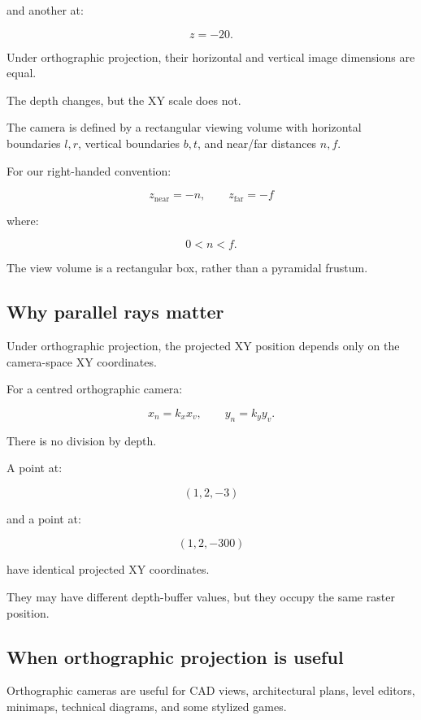 and another at:

\[
 z=-20.
\]

Under orthographic projection, their horizontal and vertical image dimensions are equal.

The depth changes, but the XY scale does not.

The camera is defined by a rectangular viewing volume with horizontal boundaries \(l,r\), vertical boundaries \(b,t\), and near/far distances \(n,f\).

For our right-handed convention:

\[
 z_{\mathrm{near}}=-n, \qquad z_{\mathrm{far}}=-f
\]

where:

\[
 0<n<f.
\]

The view volume is a rectangular box, rather than a pyramidal frustum.

\subsection{Why parallel rays matter}\label{02-foundations-ii-ch033-why-parallel-rays-matter}

\hypertarget{02-foundations-ii-ch033-why-parallel-rays-matter}{}

Under orthographic projection, the projected XY position depends only on the camera-space XY coordinates.

For a centred orthographic camera:

\[
 x_n=k_xx_v, \qquad y_n=k_yy_v.
\]

There is no division by depth.

A point at:

\[
 (1,2,-3)
\]

and a point at:

\[
 (1,2,-300)
\]

have identical projected XY coordinates.

They may have different depth-buffer values, but they occupy the same raster position.

\subsection{When orthographic projection is useful}\label{02-foundations-ii-ch033-when-orthographic-projection-is-useful}

\hypertarget{02-foundations-ii-ch033-when-orthographic-projection-is-useful}{}

Orthographic cameras are useful for CAD views, architectural plans, level editors, minimaps, technical diagrams, and some stylized games.

